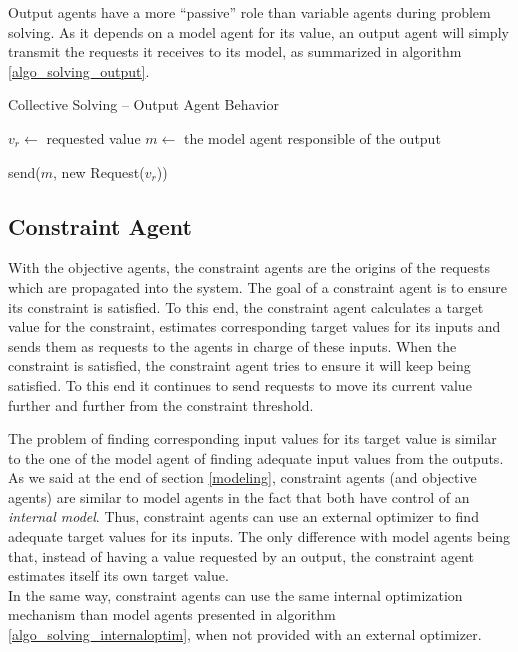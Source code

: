 Output agents have a more \enquote{passive} role than variable agents during problem solving. As it depends on a model agent for its value, an output agent will simply transmit the requests it receives to its model, as summarized in algorithm \ref{algo_solving_output}.

\begin{algorithm}
\caption{Collective Solving -- Output Agent Behavior}
\label{algo_solving_output}

	$v_r \leftarrow$ requested value\;
	$m \leftarrow$ the model agent responsible of the output \;
	
	send($m$, new Request($v_r$)) \;
	
\end{algorithm}

\subsection{Constraint Agent}

With the objective agents, the constraint agents are the origins of the requests which are propagated into the system. The goal of a constraint agent is to ensure its constraint is satisfied. To this end, the constraint agent calculates a target value for the constraint, estimates corresponding target values for its inputs and sends them as requests to the agents in charge of these inputs. When the constraint is satisfied, the constraint agent tries to ensure it will keep being satisfied. To this end it continues to send requests to move its current value further and further from the constraint threshold.

The problem of finding corresponding input values for its target value is similar to the one of the model agent of finding adequate input values from the outputs. As we said at the end of section \ref{modeling}, constraint agents (and objective agents) are similar to model agents in the fact that both have control of an \emph{internal model}. Thus, constraint agents can use an external optimizer to find adequate target values for its inputs. The only difference with model agents being that, instead of having a value requested by an output, the constraint agent estimates itself its own target value.\\
In the same way, constraint agents can use the same internal optimization mechanism than model agents presented in algorithm \ref{algo_solving_internaloptim}, when not provided with an external optimizer.

